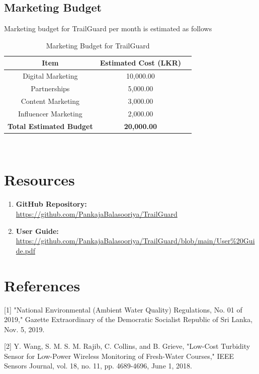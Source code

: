 \documentclass[a4paper,11pt]{article}%
\begin{document}
\subsection{Marketing Budget} 
Marketing budget for TrailGuard per month is estimated as follows
\begin{table}[h]
    \centering
    \begin{tabular}{|c|c|c|}
        \hline
        \textbf{Item} & \textbf{Estimated Cost (LKR)} \\ \hline
        Digital Marketing & 10,000.00 \\ \hline
        Partnerships & 5,000.00 \\ \hline
        Content Marketing & 3,000.00 \\ \hline
        Influencer Marketing & 2,000.00 \\ \hline
        \textbf{Total Estimated Budget} & \textbf{20,000.00} \\ \hline
    \end{tabular}
    \caption{Marketing Budget for TrailGuard}
    \label{table:marketing_budget}\
\end{table}

\section{Resources}
\begin{enumerate}
    \item \textbf{GitHub Repository:} \\
    \url{https://github.com/PankajaBalasooriya/TrailGuard}
    \item \textbf{User Guide:} \\
    \url{https://github.com/PankajaBalasooriya/TrailGuard/blob/main/User%20Guide.pdf}
\end{enumerate}
\section{References}
[1] "National Environmental (Ambient Water Quality) Regulations, No. 01 of 2019," Gazette Extraordinary of the Democratic Socialist Republic of Sri Lanka, Nov. 5, 2019.

[2] Y. Wang, S. M. S. M. Rajib, C. Collins, and B. Grieve, "Low-Cost Turbidity Sensor for Low-Power Wireless Monitoring of Fresh-Water Courses," IEEE Sensors Journal, vol. 18, no. 11, pp. 4689-4696, June 1, 2018.
\end{document}
